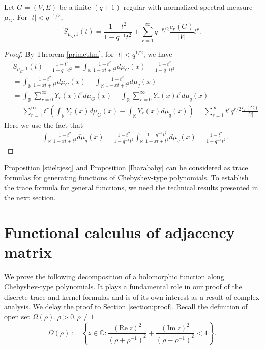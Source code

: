 \documentclass{article}
\begin{document}
\begin{proposition}\label{Iharababy}
    Let $G=(V,E)$ be a finite $(q+1)$-regular with normalized spectral measure $\mu_G$. For $|t|<q^{-1/2}$, 
    \begin{equation*}
        \widetilde{S}_{\mu_G,1}(t)=\frac{1-t^2}{1-q^{-1}t^2}+\sum_{r=1}^{\infty}q^{-r/2}\frac{c_r(G)}{|V|}t^r.
    \end{equation*}
\end{proposition}
\begin{proof}
    By Theorem \ref{primethm}, for $|t|< q^{1/2}$, we have
\begin{equation*}
\begin{aligned}
    &\widetilde{S}_{\mu_G,1}(t)-\frac{1-t^2}{1-q^{-1}t^2}=\int_{\mathbb{R}}\frac{1-t^2}{1-xt+t^2}d\mu_G(x)-\frac{1-t^2}{1-q^{-1}t^2}\\
    &=\int_{\mathbb{R}}\frac{1-t^2}{1-xt+t^2}d\mu_G(x)-\int_{\mathbb{R}}\frac{1-t^2}{1-xt+t^2}d\mu_q(x)\\
    &=\int_{\mathbb{R}}\sum_{r=0}^{\infty}Y_{r}(x)t^{r}d\mu_G(x)-\int_{\mathbb{R}}\sum_{r=0}^{\infty}Y_{r}(x)t^{r}d\mu_q(x)\\
    &=\sum_{r=1}^{\infty}t^{r}\left(\int_{\mathbb{R}}Y_{r}(x)d\mu_G(x)-\int_{\mathbb{R}}Y_{r}(x)d\mu_q(x)\right)=\sum_{r=1}^{\infty}t^{r}q^{r/2}\frac{c_r(G)}{|V|}.
\end{aligned}
\end{equation*}
Here we use the fact that
$$
\begin{aligned}
    &\int_{\mathbb{R}} \frac{1-t^2}{1-xt+t^2}d\mu_q(x)=\frac{1-t^2}{1-q^{-1}t^2}\int_{\mathbb{R}} \frac{1-q^{-1}t^2}{1-xt+t^2}d\mu_q(x)=\frac{1-t^2}{1-q^{-1}t^2}.
\end{aligned}
$$
\end{proof}

Proposition \ref{stieltjesq} and Proposition \ref{Iharababy} can be considered as trace formulas for generating functions of Chebyshev-type polynomials. To establish the trace formula for general functions, we need the technical results presented in the next section.

\section{Functional calculus of adjacency matrix}

We prove the following decomposition of a holomorphic function along Chebyshev-type polynomials. It plays a fundamental role in our proof of the discrete trace and kernel formulas and is of its own interest as a result of complex analysis. We delay the proof to Section \ref{section:proof}. Recall the definition of open set $\Omega(\rho), \rho>0, \rho\neq 1$ 
 \begin{equation*}
        \Omega(\rho):=
    \left\{z\in \mathbb{C}:\frac{(\mathrm{Re}\ z)^2}{(\rho+\rho^{-1})^2}+\frac{(\mathrm{Im}\ z)^2}{(\rho-\rho^{-1})^2}
    < 1 \right\}.
    \end{equation*}
\end{document}
